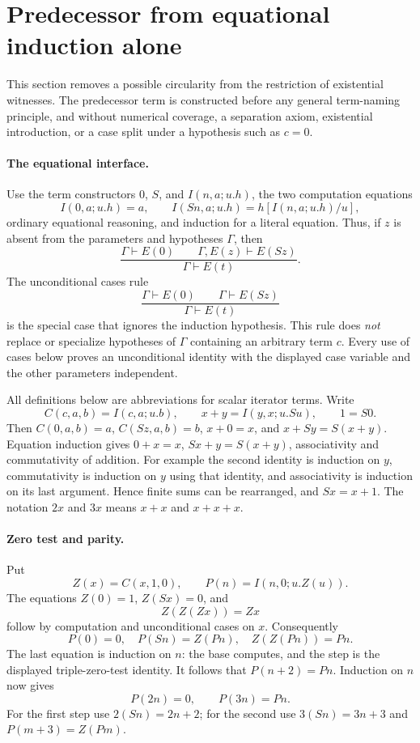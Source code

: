 \section{Predecessor from equational induction alone}
\label{sec:eq-predecessor}

This section removes a possible circularity from the restriction of existential
witnesses. The predecessor term is constructed before any general term-naming
principle, and without numerical coverage, a separation axiom, existential
introduction, or a case split under a hypothesis such as $c=0$.

\paragraph{The equational interface.}
Use the term constructors $0$, $S$, and
$I(n,a;u.h)$, the two computation equations
\[
 I(0,a;u.h)=a,\qquad
 I(Sn,a;u.h)=h[I(n,a;u.h)/u],
\]
ordinary equational reasoning, and induction for a literal equation. Thus,
if $z$ is absent from the parameters and hypotheses $\Gamma$, then
\[
 \frac{\Gamma\vdash E(0)\qquad
       \Gamma,E(z)\vdash E(Sz)}{\Gamma\vdash E(t)}.
\]
The unconditional cases rule
\[
 \frac{\Gamma\vdash E(0)\qquad\Gamma\vdash E(Sz)}
      {\Gamma\vdash E(t)}
\]
is the special case that ignores the induction hypothesis. This rule does
\emph{not} replace or specialize hypotheses of $\Gamma$ containing an
arbitrary term $c$. Every use of cases below proves an unconditional identity
with the displayed case variable and the other parameters independent.

All definitions below are abbreviations for scalar iterator terms. Write
\[
 C(c,a,b)=I(c,a;u.b),\qquad
 x+y=I(y,x;u.Su),\qquad 1=S0.
\]
Then $C(0,a,b)=a$, $C(Sz,a,b)=b$,
$x+0=x$, and $x+Sy=S(x+y)$. Equation induction gives
$0+x=x$, $Sx+y=S(x+y)$, associativity and commutativity of addition.
For example the second identity is induction on $y$, commutativity is
induction on $y$ using that identity, and associativity is induction on its
last argument. Hence finite sums can be rearranged, and $Sx=x+1$.
The notation $2x$ and $3x$ means $x+x$ and $x+x+x$.

\paragraph{Zero test and parity.}
Put
\[
 Z(x)=C(x,1,0),\qquad P(n)=I(n,0;u.Z(u)).
\]
The equations $Z(0)=1$, $Z(Sx)=0$, and
\[
 Z(Z(Zx))=Zx
\]
follow by computation and unconditional cases on $x$. Consequently
\[
 P(0)=0,\quad P(Sn)=Z(Pn),\quad Z(Z(Pn))=Pn.
\]
The last equation is induction on $n$: the base computes, and the step
is the displayed triple-zero-test identity. It follows that
$P(n+2)=Pn$. Induction on $n$ now gives
\[
 P(2n)=0,\qquad P(3n)=Pn.
\]
For the first step use $2(Sn)=2n+2$; for the second use
$3(Sn)=3n+3$ and $P(m+3)=Z(Pm)$.

